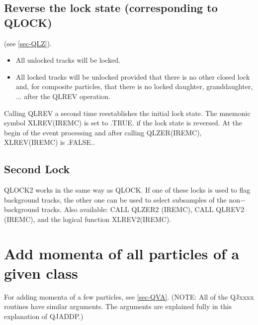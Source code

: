 \subsection{\label{sec-QLR}Reverse the lock state (corresponding
to QLOCK)}
\par
{}
\par
\par
\begin{indentlist}{ 3.25cm}{ 3.50cm}
(see \ref{sec-QLZ}).
\end{indentlist}
\begin{itemize}
\item All unlocked tracks will be locked.
\item All locked tracks will be unlocked provided that there is no
other
closed lock and, for composite particles, that there is no locked
daughter, granddaughter, ... after the QLREV operation.
\end{itemize}
\par
Calling QLREV a second time reestablishes the initial lock state.
The
mnemonic symbol XLREV(IREMC) is set to .TRUE. if the lock state is
reversed. At the begin of the event
processing and after calling QLZER(IREMC), XLREV(IREMC) is .FALSE..
 
\subsection{\label{sec-QL2}Second Lock}
\par
{}
\par
\par
QLOCK2 works in the same way as QLOCK.
If one of these locks is used to flag background tracks, the other
one
can be used to select subsamples of the non$-$background tracks.
Also available:
CALL QLZER2 (IREMC),
CALL QLREV2 (IREMC), and the logical function XLREV2(IREMC).
 
\section{\label{sec-QJA}Add momenta of all particles of a given class}
\par
{}
\par
\par
For adding momenta of a few particles, see \ref{sec-QVA}.
(NOTE: All of the QJxxxx routines have similar arguments. The
arguments are explained fully in this explanation of QJADDP.)
\par
